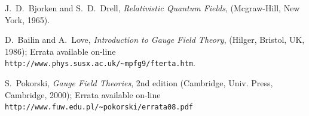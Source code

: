 \documentclass{ws-ijmpa}
\begin{document}
\begin{thebibliography}{00}    %

%
%
%
%
%
%
%
%
%

J.~D.~Bjorken and S.~D.~Drell,
\textit{Relativistic Quantum Fields},
(Mcgraw-Hill, New York, 1965).


D.~Bailin and A.~Love,
\textit{Introduction to Gauge Field Theory},
(Hilger, Bristol, UK, 1986); Errata available on-line \verb+http://www.phys.susx.ac.uk/~mpfg9/fterta.htm+.

S.~Pokorski,
\textit{Gauge Field Theories},
2nd edition (Cambridge, Univ. Press, Cambridge, 2000); Errata
available on-line \verb+http://www.fuw.edu.pl/~pokorski/errata08.pdf+ 


\end{thebibliography}
\end{document}
